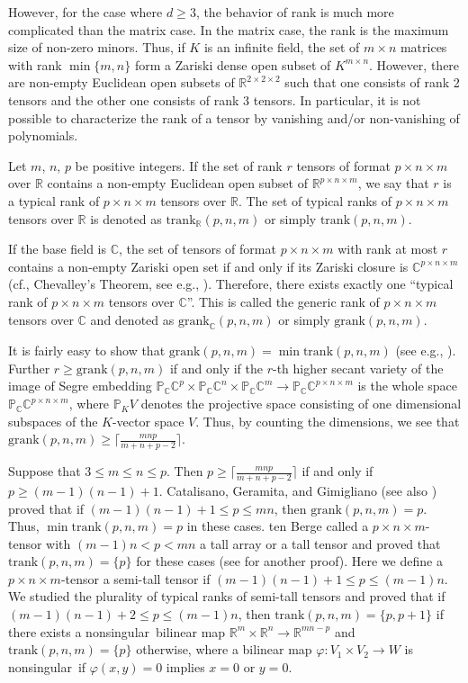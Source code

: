 \documentclass[a4paper,12pt]{article}
\newcommand{\CCC}{\mathbb{C}}
\newcommand{\PPP}{\mathbb{P}}
\newcommand{\RRR}{\mathbb{R}}
\newcommand\nonsing{nonsingular}
\newcommand{\grank}{{\mathrm{grank}}}
\newcommand{\trank}{{\mathrm{trank}}}
\begin{document}
However, for the case where $d\geq 3$, the behavior of rank is much more
complicated than the matrix case.
In the matrix case, the rank is the maximum size of non-zero minors.
Thus, if $K$ is an infinite field, the set of $m\times n$ matrices with rank $\min\{m, n\}$ form a
Zariski dense open subset of $K^{m\times n}$.
However, there are non-empty Euclidean open subsets of $\RRR^{2\times 2\times 2}$
such that one consists of rank 2 tensors and the other one consists of
rank 3 tensors.
In particular, it is not possible to characterize the rank of a tensor
by 
vanishing and/or non-vanishing of 
polynomials.

Let $m$, $n$, $p$ be positive integers.
If the set of rank $r$ tensors of format $p\times n\times m$ over $\RRR$ 
contains a non-empty Euclidean open subset of $\RRR^{p\times n\times m}$, 
we say that $r$ is a typical rank 
of $p\times n\times m$ tensors over $\RRR$.
The set of typical ranks of $p\times n\times m$ tensors over $\RRR$ is
denoted as $\trank_\RRR(p,n,m)$ or simply $\trank(p,n,m)$.

If the base field is $\CCC$, the set of tensors of format $p\times n\times m$
with rank at most $r$ contains a non-empty Zariski open set if and only if
its Zariski closure is $\CCC^{p\times n\times m}$
(cf., Chevalley's Theorem, see e.g., \cite[p.\ 39]{har92}).
Therefore, there exists exactly one ``typical rank of $p\times n\times m$
tensors over $\CCC$''.
This is called the generic rank of $p\times n\times m$ tensors over $\CCC$
and denoted as $\grank_\CCC(p,n,m)$ or simply $\grank(p,n,m)$.

It is fairly easy to show that $\grank(p,n,m)=\min\trank(p,n,m)$
(see e.g., \cite[Chapter 6]{ssm16}).
Further $r\geq \grank(p,n,m)$ if and only if the $r$-th higher secant variety
of the image of Segre embedding $\PPP_\CCC\CCC^p\times\PPP_\CCC\CCC^n\times\PPP_\CCC\CCC^m
\to\PPP_\CCC\CCC^{p\times n\times m}$ is the whole space $\PPP_\CCC\CCC^{p\times n\times m}$,
where $\PPP_K V$ denotes the projective space 
consisting of one dimensional subspaces of the $K$-vector space $V$.
Thus, by counting the dimensions, we see that
$\grank(p,n,m)\geq\lceil \frac{mnp}{m+n+p-2}\rceil$.

Suppose that $3\leq m\leq n\leq p$.
Then $p\geq\lceil\frac{mnp}{m+n+p-2}\rceil$ if and only if $p\geq(m-1)(n-1)+1$.
Catalisano, Geramita, and Gimigliano \cite{cgg02} (see also \cite{cgg08})
proved that if $(m-1)(n-1)+1\leq p\leq mn$, then $\grank(p,n,m)=p$.
Thus, $\min\trank(p,n,m)=p$ in these cases.
ten Berge \cite{tb00} called a $p\times n\times m$-tensor with $(m-1)n<p<mn$ a tall
array or a tall tensor and proved that $\trank(p,n,m)=\{p\}$ for these cases
(see \cite[Chapter 6]{ssm16} for another proof).
Here we define a $p\times n\times m$-tensor a semi-tall tensor if
$(m-1)(n-1)+1\leq p\leq (m-1)n$.
We \cite{ssm13,sms15,sms17} studied the plurality of typical ranks 
of semi-tall tensors and proved
that if $(m-1)(n-1)+2\leq p\leq (m-1)n$, then $\trank(p,n,m)=\{p,p+1\}$ if there
exists a \nonsing\  bilinear map $\RRR^m\times \RRR^n\to \RRR^{mn-p}$ and
$\trank(p,n,m)=\{p\}$ otherwise, where a bilinear map
$\varphi\colon V_1\times V_2\to W$ is \nonsing\  if $\varphi(x,y)=0$ 
implies $x=0$ or $y=0$.
\end{document}
